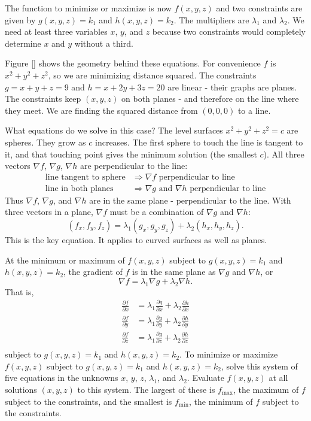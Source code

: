 The function to minimize or maximize is now $f(x,y,z)$ and two constraints are given by $g(x,y,z) = k_1$ and $h(x,y,z) = k_2$.  The multipliers are $\lambda_1$ and $\lambda_2$.  We need at least three variables $x$, $y$, and $z$ because two constraints would completely determine $x$ and $y$ without a third.

Figure \ref{} shows the geometry behind these equations.  For convenience $f$ is $x^2 + y^2 + z^2$, so we are minimizing distance squared.  The constraints $g = x + y + z = 9$ and $h = x + 2y + 3z = 20$ are linear - their graphs are planes.  The constraints keep $(x,y,z)$ on both planes - and therefore on the line where they meet.  We are finding the squared distance from $(0,0,0)$ to a line.  

What equations do we solve in this case?  The level surfaces $x^2 + y^2 + z^2 = c$ are spheres.  They grow as $c$ increases.  The first sphere to touch the line is tangent to it, and that touching point gives the minimum solution (the smallest $c$). All three vectors $\nabla f$, $\nabla g$, $\nabla h$ are perpendicular to the line:
\begin{align*}
\text{line tangent to sphere} & \Rightarrow \nabla f \text{ perpendicular to line} \\
\text{line in both planes} & \Rightarrow \nabla g \text{ and } \nabla h \text{ perpendicular to line}
\end{align*}
Thus $\nabla f$, $\nabla g$, and $\nabla h$ are in the same plane - perpendicular to the line.  With three vectors in a plane, $\nabla f$ must be a combination of $\nabla g$ and $\nabla h$:
$$(f_x,f_y,f_z) = \lambda_1 (g_x,g_y,g_z) + \lambda_2 (h_x,h_y,h_z).$$
This is the key equation.  It applies to curved surfaces as well as planes.

{At the minimum or maximum of $f(x, y, z)$ subject to $g(x, y, z) = k_1$ and $h(x,y,z) = k_2$, the gradient of $f$ is in the same plane as $\nabla g$ and $\nabla h$, or $$\nabla f = \lambda_1 \nabla g + \lambda_2 \nabla h.$$
That is, 
\begin{align*}
\frac{\partial f}{\partial x} & = \lambda_1 \frac{\partial g}{\partial x} + \lambda_2 \frac{\partial h}{\partial x} \\
\frac{\partial f}{\partial y} & = \lambda_1 \frac{\partial g}{\partial y} + \lambda_2 \frac{\partial h}{\partial y} \\
\frac{\partial f}{\partial z} & = \lambda_1 \frac{\partial g}{\partial z} + \lambda_2 \frac{\partial h}{\partial z} \\
\end{align*}
subject to $g(x,y,z) = k_1$ and $h(x,y,z) = k_2$. To minimize or maximize $f(x,y,z)$ subject to $g(x,y,z) = k_1$ and $h(x,y,z) = k_2$, solve this system of five equations in the unknowns $x$, $y$, $z$, $\lambda_1$, and $\lambda_2$. Evaluate $f(x,y,z)$ at all solutions $(x,y,z)$ to this system.  The largest of these is $f_{\text{max}}$, the maximum of $f$ subject to the constraints, and the smallest is $f_{\text{min}}$, the minimum of $f$ subject to the constraints.
}

